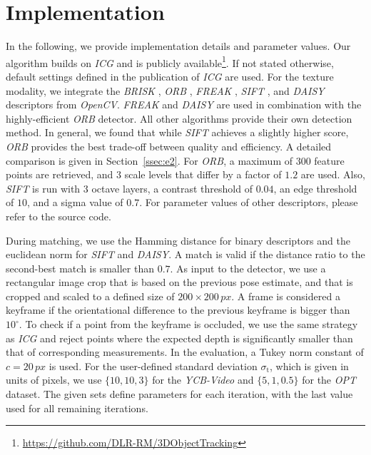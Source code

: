 \documentclass[letterpaper, 10 pt, conference]{ieeeconf}
\begin{document}
\section{Implementation}\label{sec:i}
In the following, we provide implementation details and parameter values.
Our algorithm builds on \textit{ICG} and is publicly available\footnote{\url{https://github.com/DLR-RM/3DObjectTracking}}.
If not stated otherwise, default settings defined in the publication of \textit{ICG} \cite{Stoiber2022} are used.
For the texture modality, we integrate the \textit{BRISK} \cite{Leutenegger2011}, \textit{ORB} \cite{Rublee2011}, \textit{FREAK} \cite{Alahi2012}, \textit{SIFT} \cite{Lowe2004}, and \textit{DAISY} \cite{Tola2010} descriptors from \textit{OpenCV}.
\textit{FREAK} and \textit{DAISY} are used in combination with the highly-efficient \textit{ORB} detector.
All other algorithms provide their own detection method.
In general, we found that while \textit{SIFT} achieves a slightly higher score, \textit{ORB} provides the best trade-off between quality and efficiency.
A detailed comparison is given in Section~\ref{ssec:e2}.
For \textit{ORB}, a maximum of $300$ feature points are retrieved, and $3$ scale levels that differ by a factor of $1.2$ are used.
Also, \textit{SIFT} is run with $3$ octave layers, a contrast threshold of $0.04$, an edge threshold of $10$, and a sigma value of $0.7$.
For parameter values of other descriptors, please refer to the source code.

During matching, we use the Hamming distance for binary descriptors and the euclidean norm for \textit{SIFT} and \textit{DAISY}.
A match is valid if the distance ratio to the second-best match is smaller than $0.7$.
As input to the detector, we use a rectangular image crop that is based on the previous pose estimate, and that is cropped and scaled to a defined size of $200 \times 200\,\unit{px}$.
A frame is considered a keyframe if the orientational difference to the previous keyframe is bigger than $10^\circ$.
To check if a point from the keyframe is occluded, we use the same strategy as \textit{ICG} and reject points where the expected depth is significantly smaller than that of corresponding measurements.
In the evaluation, a Tukey norm constant of $c = 20\,\unit{px}$ is used.
For the user-defined standard deviation $\sigma_\textrm{t}$, which is given in units of pixels, we use $\{10, 10, 3\}$ for the \textit{YCB-Video} and $\{5, 1, 0.5\}$ for the \textit{OPT} dataset.
The given sets define parameters for each iteration, with the last value used for all remaining iterations.
\end{document}
